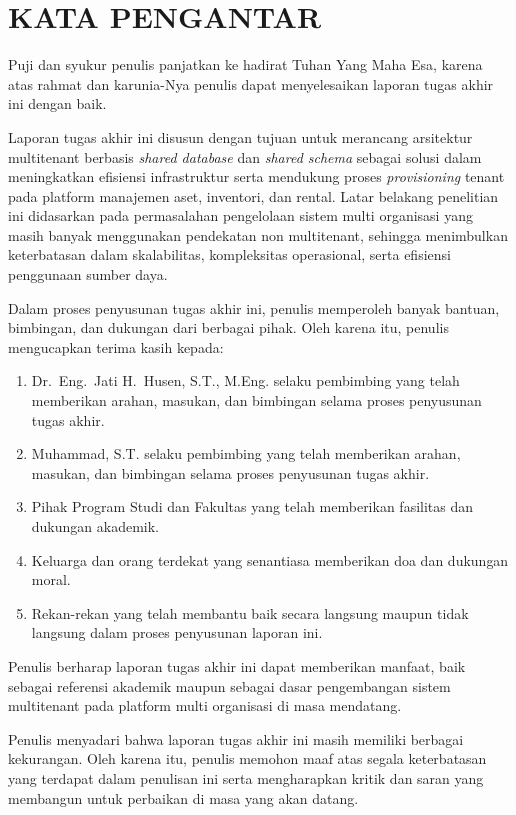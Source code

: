 \chapter*{KATA PENGANTAR}

Puji dan syukur penulis panjatkan ke hadirat Tuhan Yang Maha Esa, karena atas rahmat dan
karunia-Nya penulis dapat menyelesaikan laporan tugas akhir ini dengan baik.

Laporan tugas akhir ini disusun dengan tujuan untuk merancang arsitektur multitenant berbasis
\textit{shared database} dan \textit{shared schema} sebagai solusi dalam meningkatkan efisiensi
infrastruktur serta mendukung proses \textit{provisioning} tenant pada platform manajemen aset,
inventori, dan rental. Latar belakang penelitian ini didasarkan pada permasalahan pengelolaan
sistem multi organisasi yang masih banyak menggunakan pendekatan non multitenant, sehingga
menimbulkan keterbatasan dalam skalabilitas, kompleksitas operasional, serta efisiensi penggunaan
sumber daya.

Dalam proses penyusunan tugas akhir ini, penulis memperoleh banyak bantuan, bimbingan, dan
dukungan dari berbagai pihak. Oleh karena itu, penulis mengucapkan terima kasih kepada:

\begin{enumerate}
  \item Dr.~Eng.~Jati H.~Husen, S.T., M.Eng. selaku pembimbing yang telah memberikan arahan,
    masukan, dan bimbingan selama proses penyusunan tugas akhir.
  \item Muhammad, S.T. selaku pembimbing yang telah memberikan arahan, masukan, dan bimbingan
    selama proses penyusunan tugas akhir.
  \item Pihak Program Studi dan Fakultas yang telah memberikan fasilitas dan dukungan akademik.
  \item Keluarga dan orang terdekat yang senantiasa memberikan doa dan dukungan moral.
  \item Rekan-rekan yang telah membantu baik secara langsung maupun tidak langsung dalam proses
    penyusunan laporan ini.
\end{enumerate}

Penulis berharap laporan tugas akhir ini dapat memberikan manfaat, baik sebagai referensi akademik
maupun sebagai dasar pengembangan sistem multitenant pada platform multi organisasi di masa
mendatang.

Penulis menyadari bahwa laporan tugas akhir ini masih memiliki berbagai kekurangan. Oleh karena
itu, penulis memohon maaf atas segala keterbatasan yang terdapat dalam penulisan ini serta
mengharapkan kritik dan saran yang membangun untuk perbaikan di masa yang akan datang.

